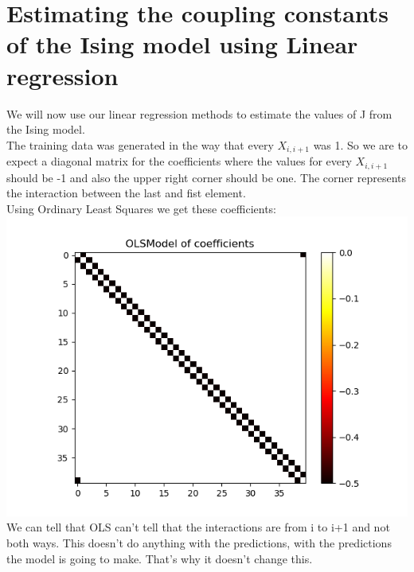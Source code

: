\documentclass[a4paper,norsk]{article}
\begin{document}
\section{Estimating the coupling constants of the Ising model using Linear regression}
We will now use our linear regression methods to estimate the values of J from the Ising model.\\
The training data was generated in the way that every $X_{i, i+1}$ was 1. So we are to expect a diagonal matrix for the coefficients where the values for every $X_{i, i+1}$ should be -1 and also the upper right corner should be one. The corner represents the interaction between the last and fist element.\\
Using Ordinary Least Squares we get these coefficients:\\
\includegraphics[scale=.7]{images/OLScoef}\\
We can tell that OLS can't tell that the interactions are from i to i+1 and not both ways. This doesn't do anything with the predictions, with the predictions the model is going to make. That's why it doesn't change this.
\end{document}
